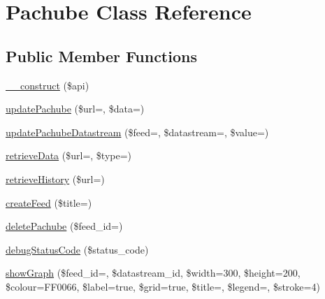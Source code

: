 \hypertarget{class_pachube}{}\section{Pachube Class Reference}
\label{class_pachube}
\subsection*{Public Member Functions}
\begin{DoxyCompactItemize}
\item 
\hyperlink{class_pachube_a71463c168d5968082dc89c8d30bf98c7}{\+\_\+\+\_\+construct} (\$api)
\item 
\hyperlink{class_pachube_ada5b147be4301ab1d954d8b227346d50}{update\+Pachube} (\$url=\textquotesingle{}\textquotesingle{}, \$data=\textquotesingle{}\textquotesingle{})
\item 
\hyperlink{class_pachube_a74aba2162d61d6610d4c8ed27d41100b}{update\+Pachube\+Datastream} (\$feed=\textquotesingle{}\textquotesingle{}, \$datastream=\textquotesingle{}\textquotesingle{}, \$value=\textquotesingle{}\textquotesingle{})
\item 
\hyperlink{class_pachube_a070b9227d99e9897ff5fad7ec04e7cd5}{retrieve\+Data} (\$url=\textquotesingle{}\textquotesingle{}, \$type=\textquotesingle{}\textquotesingle{})
\item 
\hyperlink{class_pachube_a27f0475b91c66e56b5917657e6a4fd60}{retrieve\+History} (\$url=\textquotesingle{}\textquotesingle{})
\item 
\hyperlink{class_pachube_a5e098fee46410680ef88b0a932fd3f4a}{create\+Feed} (\$title=\textquotesingle{}\textquotesingle{})
\item 
\hyperlink{class_pachube_a8b523cf96215b9ed33feeb56e9b14400}{delete\+Pachube} (\$feed\+\_\+id=\textquotesingle{}\textquotesingle{})
\item 
\hyperlink{class_pachube_a3020cab1c1d428e04a04e27ad2fbbbe4}{debug\+Status\+Code} (\$status\+\_\+code)
\item 
\hyperlink{class_pachube_ace2e0e76d45db6ed2d0ac7b2218f8aa1}{show\+Graph} (\$feed\+\_\+id=\textquotesingle{}\textquotesingle{}, \$datastream\+\_\+id, \$width=\textquotesingle{}300\textquotesingle{}, \$height=\textquotesingle{}200\textquotesingle{}, \$colour=\textquotesingle{}F\+F0066\textquotesingle{}, \$label=true, \$grid=true, \$title=\textquotesingle{}\textquotesingle{}, \$legend=\textquotesingle{}\textquotesingle{}, \$stroke=\textquotesingle{}4\textquotesingle{})
\item 

\end{DoxyCompactItemize}
